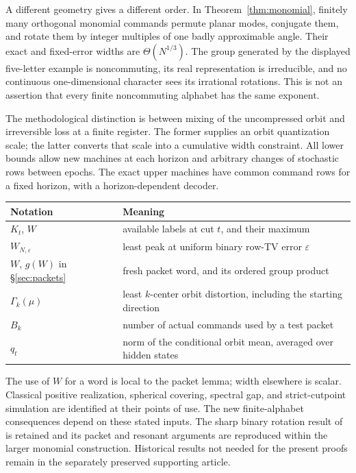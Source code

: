 A different geometry gives a different order. In
Theorem~\ref{thm:monomial}, finitely many orthogonal monomial commands
permute planar modes, conjugate them, and rotate them by integer multiples
of one badly approximable angle. Their exact and fixed-error widths are
$\Theta(N^{1/3})$. The group generated by the displayed five-letter
example is noncommuting, its real representation is irreducible, and
no continuous one-dimensional character sees its irrational rotations.
This is not an assertion that every finite noncommuting alphabet has the
same exponent.

The methodological distinction is between mixing of the uncompressed
orbit and irreversible loss at a finite register. The former supplies
an orbit quantization scale; the latter converts that scale into a
cumulative width constraint. All lower bounds allow new machines at
each horizon and arbitrary changes of stochastic rows between epochs.
The exact upper machines have common command rows for a fixed horizon,
with a horizon-dependent decoder.

\begin{center}
\begin{tabular}{p{}p{}}
\toprule
Notation & Meaning \\
\midrule
$K_t$, $W$ & available labels at cut $t$, and their maximum \\
$W_{N,\varepsilon}$ & least peak at uniform binary row-TV error $\varepsilon$ \\
$W$, $g(W)$ in \S\ref{sec:packets} & fresh packet word, and its ordered group product \\
$\Gamma_k(\mu)$ & least $k$-center orbit distortion, including the starting direction \\
$B_k$ & number of actual commands used by a test packet \\
$q_t$ & norm of the conditional orbit mean, averaged over hidden states \\
\bottomrule
\end{tabular}
\end{center}
The use of $W$ for a word is local to the packet lemma; width elsewhere
is scalar. Classical positive realization, spherical covering, spectral
gap, and strict-cutpoint simulation are identified at their points of
use. The new finite-alphabet consequences depend on these stated inputs.
The sharp binary rotation result of \cite{GTF35} is retained and its
packet and resonant arguments are reproduced within the larger monomial
construction. Historical results not needed for the present proofs remain
in the separately preserved supporting article.
